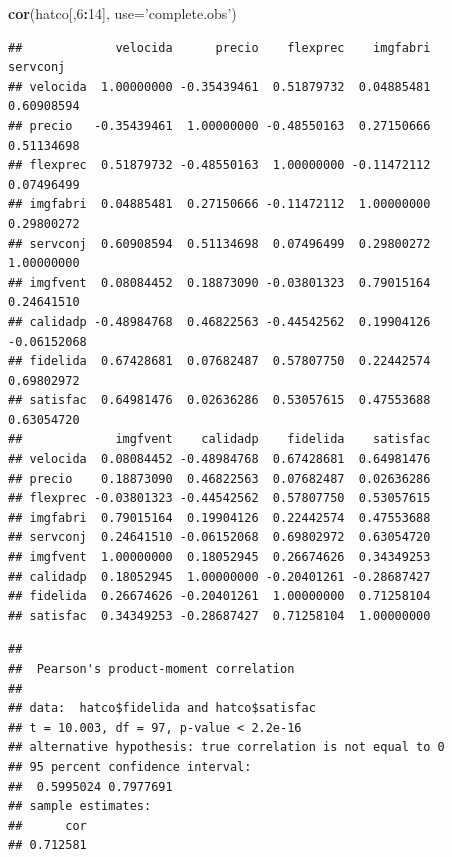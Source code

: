 \documentclass[]{book}
\newenvironment{Shaded}{\begin{snugshade}}{\end{snugshade}}
\newcommand{\KeywordTok}[1]{\textcolor[rgb]{0.13,0.29,0.53}{\textbf{#1}}}
\newcommand{\DataTypeTok}[1]{\textcolor[rgb]{0.13,0.29,0.53}{#1}}
\newcommand{\DecValTok}[1]{\textcolor[rgb]{0.00,0.00,0.81}{#1}}
\newcommand{\StringTok}[1]{\textcolor[rgb]{0.31,0.60,0.02}{#1}}
\newcommand{\OperatorTok}[1]{\textcolor[rgb]{0.81,0.36,0.00}{\textbf{#1}}}
\newcommand{\NormalTok}[1]{#1}
\begin{document}
\begin{Shaded}
\begin{Highlighting}[]
\KeywordTok{cor}\NormalTok{(hatco[,}\DecValTok{6}\OperatorTok{:}\DecValTok{14}\NormalTok{], }\DataTypeTok{use=}\StringTok{'complete.obs'}\NormalTok{)}
\end{Highlighting}
\end{Shaded}

\begin{verbatim}
##             velocida      precio    flexprec    imgfabri    servconj
## velocida  1.00000000 -0.35439461  0.51879732  0.04885481  0.60908594
## precio   -0.35439461  1.00000000 -0.48550163  0.27150666  0.51134698
## flexprec  0.51879732 -0.48550163  1.00000000 -0.11472112  0.07496499
## imgfabri  0.04885481  0.27150666 -0.11472112  1.00000000  0.29800272
## servconj  0.60908594  0.51134698  0.07496499  0.29800272  1.00000000
## imgfvent  0.08084452  0.18873090 -0.03801323  0.79015164  0.24641510
## calidadp -0.48984768  0.46822563 -0.44542562  0.19904126 -0.06152068
## fidelida  0.67428681  0.07682487  0.57807750  0.22442574  0.69802972
## satisfac  0.64981476  0.02636286  0.53057615  0.47553688  0.63054720
##             imgfvent    calidadp    fidelida    satisfac
## velocida  0.08084452 -0.48984768  0.67428681  0.64981476
## precio    0.18873090  0.46822563  0.07682487  0.02636286
## flexprec -0.03801323 -0.44542562  0.57807750  0.53057615
## imgfabri  0.79015164  0.19904126  0.22442574  0.47553688
## servconj  0.24641510 -0.06152068  0.69802972  0.63054720
## imgfvent  1.00000000  0.18052945  0.26674626  0.34349253
## calidadp  0.18052945  1.00000000 -0.20401261 -0.28687427
## fidelida  0.26674626 -0.20401261  1.00000000  0.71258104
## satisfac  0.34349253 -0.28687427  0.71258104  1.00000000
\end{verbatim}

\begin{Shaded}
\end{Shaded}

\begin{verbatim}
## 
##  Pearson's product-moment correlation
## 
## data:  hatco$fidelida and hatco$satisfac
## t = 10.003, df = 97, p-value < 2.2e-16
## alternative hypothesis: true correlation is not equal to 0
## 95 percent confidence interval:
##  0.5995024 0.7977691
## sample estimates:
##      cor 
## 0.712581
\end{verbatim}
\end{document}
